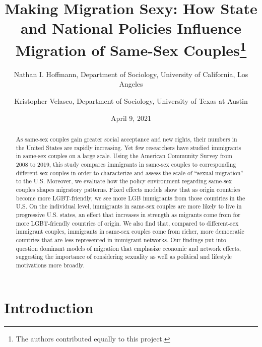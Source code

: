 \documentclass[
  11pt,
]{article}
\title{Making Migration Sexy: How State and National Policies Influence Migration of Same-Sex Couples\thanks{The authors contributed equally to this project.}}
\author{Nathan I. Hoffmann, Department of Sociology, University of California, Los Angeles \and Kristopher Velasco, Department of Sociology, University of Texas at Austin}
\date{April 9, 2021}
\begin{document}
\maketitle
\begin{abstract}
As same-sex couples gain greater social acceptance and new rights, their numbers in the United States are rapidly increasing. Yet few researchers have studied immigrants in same-sex couples on a large scale. Using the American Community Survey from 2008 to 2019, this study compares immigrants in same-sex couples to corresponding different-sex couples in order to characterize and assess the scale of ``sexual migration'' to the U.S. Moreover, we evaluate how the policy environment regarding same-sex couples shapes migratory patterns. Fixed effects models show that as origin countries become more LGBT-friendly, we see more LGB immigrants from those countries in the U.S. On the individual level, immigrants in same-sex couples are more likely to live in progressive U.S. states, an effect that increases in strength as migrants come from for more LGBT-friendly countries of origin. We also find that, compared to different-sex immigrant couples, immigrants in same-sex couples come from richer, more democratic countries that are less represented in immigrant networks. Our findings put into question dominant models of migration that emphasize economic and network effects, suggesting the importance of considering sexuality as well as political and lifestyle motivations more broadly.
\end{abstract}

\hypertarget{introduction}{%
\section{Introduction}\label{introduction}}
\end{document}

